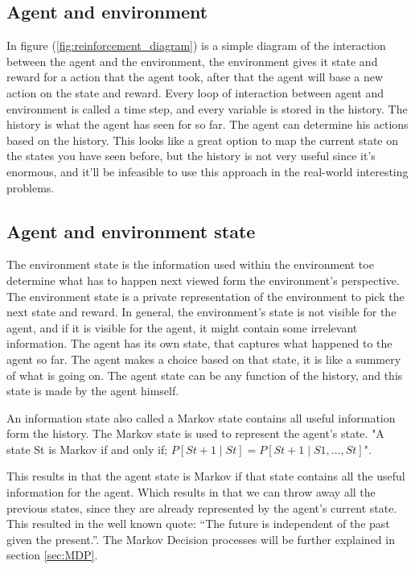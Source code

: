 \documentclass{report}
\begin{document}
\subsection{Agent and environment}
In figure (\ref{fig:reinforcement_diagram}) is a simple diagram of the interaction between the agent and the environment, the environment gives it state and reward for a action that the agent took, after that the agent will base a new action on the state and reward. Every loop of interaction between agent and environment is called a time step, and every variable is stored in the history. The history is what the agent has seen for so far.  The agent can determine his actions based on the history. This looks like a great option to map the current state on the states you have seen before, but the history is not very useful since it’s enormous, and it’ll be infeasible to use this approach in the real-world interesting problems.

\subsection{Agent and environment state}
The environment state is the information used within the environment toe determine what has to happen next viewed form the environment’s perspective. The environment state is a private representation of the environment to pick the next state and reward. In general, the environment’s state is not visible for the agent, and if it is visible for the agent, it might contain some irrelevant information. The agent has its own state, that captures what happened to the agent so far. The agent makes a choice based on that state, it is like a summery of what is going on. The agent state can be any function of the history, and this state is made by the agent himself.

An information state also called a Markov state contains all useful information form the history. The Markov state is used to represent the agent’s state. "A state St is Markov if and only if; $P[St +1\mid St] = P[St+1 \mid S1,...,St]$"\cite{RL_intro}.

This results in that the agent state is Markov if that state contains all the useful information for the agent. Which results in that we can throw away all the previous states, since they are already represented by the agent’s current state. This resulted in the well known quote: “The future is independent of the past given the present.”. The Markov Decision processes will be further explained in section \ref{sec:MDP}.
\end{document}
